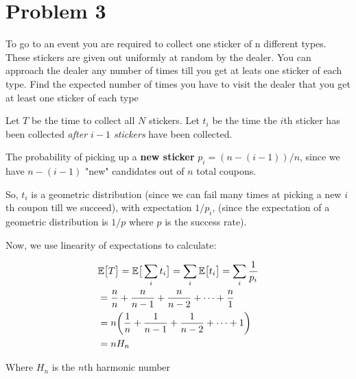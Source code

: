 \documentclass{article}
\begin{document}
\section{Problem 3}
To go to an event you are required to collect one sticker of
n different types. These stickers are given out uniformly at random by the
dealer. You can approach the dealer any number of times till you get at
leats one sticker of each type. Find the expected number of times you have
to visit the dealer that you get at least one sticker of each type


Let $T$ be the time to collect all $N$ stickers. Let $t_i$ be the time
the $i$th sticker has been collected \textit{after $i - 1$ stickers} have been
collected.

The probability of picking up a \textbf{new sticker} $p_i = (n - (i - 1))/n$, since
we have $n - (i - 1)$ "new" candidates out of $n$ total coupons.

So, $t_i$ is a geometric distribution (since we can fail many times at picking
a new $i$th coupon till we succeed), with expectation $1/p_i$, (since the expectation
of a geometric distribution is $1/p$ where $p$ is the success rate).


Now, we use linearity of expectations to calculate:

\begin{align*}
&\mathbb{E}\big[ T \big] = \mathbb{E}\big[ \sum_i t_i \big] = \sum_i \mathbb{E}\big[ t_i \big] = \sum_i \frac{1}{p_i} \\
&=  \frac{n}{n} + \frac{n}{n - 1} + \frac{n}{n - 2} + \dots + \frac{n}{1}\\
&= n \bigg(  \frac{1}{n} + \frac{1}{n - 1} + \frac{1}{n - 2} + \dots + 1 \bigg) \\
& = n H_n
\end{align*}

Where $H_n$ is the $n$th harmonic number
\end{document}
